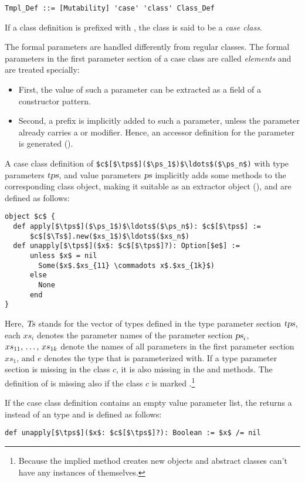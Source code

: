 \syntax\begin{lstlisting}
Tmpl_Def ::= [Mutability] 'case' 'class' Class_Def
\end{lstlisting}

If a class definition is prefixed with , the class is said to be a {\em case class}. 

The formal parameters are handled differently from regular classes. The formal parameters in the first parameter section of a case class are called {\em elements} and are treated specially:
\begin{itemize}
\item[] First, the value of such a parameter can be extracted as a field of a constructor pattern. 
\item[] Second, a  prefix is implicitly added to such a parameter, unless the parameter already carries a  or  modifier. Hence, an accessor definition for the parameter is generated (). 
\end{itemize}

A case class definition of \lstinline!$c$[$\tps$]($\ps_1$)$\ldots$($\ps_n$)! with type parameters $\mbox{\sl tps}$, and value parameters $\mbox{\sl ps}$ implicitly adds some methods to the corresponding class object, making it suitable as an extractor object (), and are defined as follows:
\begin{lstlisting}
object $c$ {
  def apply[$\tps$]($\ps_1$)$\ldots$($\ps_n$): $c$[$\tps$] := 
      $c$[$\Ts$].new($xs_1$)$\ldots$($xs_n$)
  def unapply[$\tps$]($x$: $c$[$\tps$]?): Option[$e$] :=
      unless $x$ = nil
        Some($x$.$xs_{11} \commadots x$.$xs_{1k}$)
      else
        None
      end
}
\end{lstlisting}

Here, $\mbox{\sl Ts}$ stands for the vector of types defined in the type parameter section $\mbox{\sl tps}$, each $xs_i$ denotes the parameter names of the parameter section $\mbox{\sl ps}_i$, $xs_{11} ,\, \ldots ,\, xs_{1k}$ denote the names of all parameters in the first parameter section $xs_1$, and $e$ denotes the type that  is parameterized with. If a type parameter section is missing in the class $c$, it is also missing in the  and  methods. The definition of  is missing also if the class $c$ is marked .\footnote{Because the implied  method creates new objects and abstract classes can't have any instances of themselves.}

If the case class definition contains an empty value parameter list, the  returns a  instead of an  type and is defined as follows:
\begin{lstlisting}
def unapply[$\tps$]($x$: $c$[$\tps$]?): Boolean := $x$ /= nil
\end{lstlisting}

